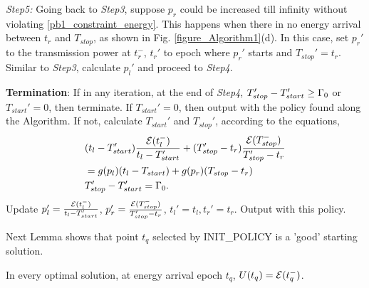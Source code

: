 \textit{Step5:} Going back to \textit{Step3}, suppose $p_r$ could be increased till infinity without violating \eqref{pb1_constraint_energy}. This happens when there in no energy arrival between $t_r$ and $T_{stop}$, as shown in Fig. \ref{figure_Algorithm1}(d). In this case, set $p_r'$ to the transmission power at $t_r^-$, $t_r'$ to epoch where $p_r'$ starts and $T_{stop}'=t_r$. Similar to \textit{Step3}, calculate $p_l'$ and proceed to \textit{Step4}. 

\textbf{Termination}: If in any iteration, at the end of \textit{Step4}, $T_{stop}' - T_{start}' \ge \Gamma_0$ or $T_{start}' = 0$, then terminate. If $T_{start}' = 0$, then output with the policy found along the Algorithm. If not, calculate $T_{start}'$ and $T_{stop}'$, according to the equations,
\begin{align}
&\nonumber (t_l-T_{start}')\frac{\ETx(t_l^-)}{t_l-T_{start}'}+(T_{stop}'-t_r)\frac{\ETx(T_{stop}^-)}{T_{stop}'-t_r}\\
&=g(p_l)(t_l-T_{start})+g(p_r)(T_{stop}-t_r)\\
&T_{stop}'-T_{start}'=\TRx_0.
\label{eq_termination}
\end{align}
Update $p_l'=\frac{\mathcal{E}(t_l^-)}{t_l-T_{start}'}$, $p_r'=\frac{\mathcal{E}(T_{stop}^-)}{T_{stop}'-t_r}$, $t_l'=t_l,t_r'=t_r$. Output with this policy. 

Next Lemma shows that point $t_q$ selected by INIT\_POLICY is a 'good' starting solution.
\begin{lemma}
In every optimal solution, at energy arrival epoch $t_q$, $U(t_q)=\mathcal{E}(t_q^-)$.
\label{lemma_Q}
\end{lemma}

